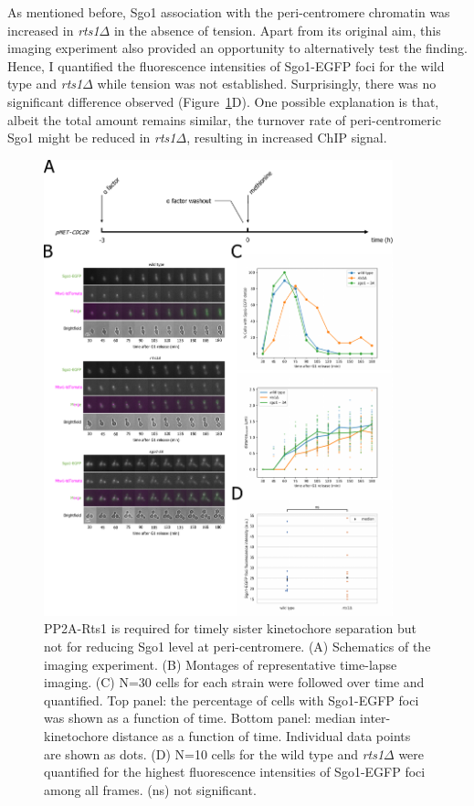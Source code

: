 As mentioned before, Sgo1 association with the peri-centromere chromatin was increased in \textit{rts1$\Delta$} in the absence of tension. Apart from its original aim, this imaging experiment also provided an opportunity to alternatively test the finding. Hence, I quantified the fluorescence intensities of Sgo1-EGFP foci for the wild type and \textit{rts1$\Delta$} while tension was not established. Surprisingly, there was no significant difference observed (Figure~\ref{fig:sgo1rts1mutants}D). One possible explanation is that, albeit the total amount remains similar, the turnover rate of peri-centromeric Sgo1 might be reduced in \textit{rts1$\Delta$}, resulting in increased ChIP signal. 

\begin{figure}[htbp]
  \centering
  \includegraphics[width=0.9\textwidth]{chapter3/figures/Sgo1 rts1 mutants.pdf}
  \caption[PP2A-Rts1 is required for timely sister kinetochore separation but not for reducing Sgo1 level at peri-centromere]{PP2A-Rts1 is required for timely sister kinetochore separation but not for reducing Sgo1 level at peri-centromere. (A) Schematics of the imaging experiment. (B) Montages of representative time-lapse imaging. (C) N=30 cells for each strain were followed over time and quantified. Top panel: the percentage of cells with Sgo1-EGFP foci was shown as a function of time. Bottom panel: median inter-kinetochore distance as a function of time. Individual data points are shown as dots. (D) N=10 cells for the wild type and \textit{rts1$\Delta$} were quantified for the highest fluorescence intensities of Sgo1-EGFP foci among all frames. (ns) not significant.}
  \label{fig:sgo1rts1mutants}
\end{figure}
